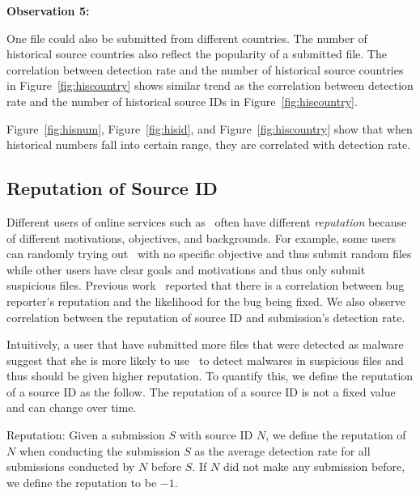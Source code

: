 {\bf Observation 5:} 
{\em }

One file could also be submitted from different countries. 
The number of historical source countries also reflect the popularity of a submitted file. 
The correlation between detection rate and the number of historical source countries in 
Figure~\ref{fig:hiscountry} shows similar trend as the correlation between detection rate 
and the number of historical source IDs in Figure~\ref{fig:hiscountry}. 

Figure~\ref{fig:hisnum}, Figure~\ref{fig:hisid}, and Figure~\ref{fig:hiscountry} show that 
when historical numbers fall into certain range, they are correlated with detection rate. 
\fi

\subsection{Reputation of Source ID}
\label{sec:reputation}


Different users of online services such as \vt\ often have different {\em reputation} 
because of different motivations, objectives, and backgrounds.
For example, some users can randomly trying out \vt\ with no specific objective and thus submit random files
while other users have clear goals and motivations and thus only submit suspicious files.
Previous work~\cite{GuoICSE2010} reported that there is a correlation between bug reporter’s reputation and the likelihood for the bug being fixed. 
We also observe correlation between the reputation of source ID and submission’s detection rate. 

Intuitively, a user that have submitted more files that were detected as malware suggest 
that she is more likely to use \vt\ to detect malwares in suspicious files 
and thus should be given higher reputation.
To quantify this, we define the reputation of a source ID as the follow.
The reputation of a source ID is not a fixed value and can change over time. 

\begin{definition}{Reputation:}
Given a submission $S$ with source ID $N$, 
we define the reputation of $N$ when conducting the submission $S$ as the average detection rate for all submissions conducted by $N$ before $S$. 
If $N$ did not make any submission before, we define the reputation to be $-1$. 
\end{definition}

